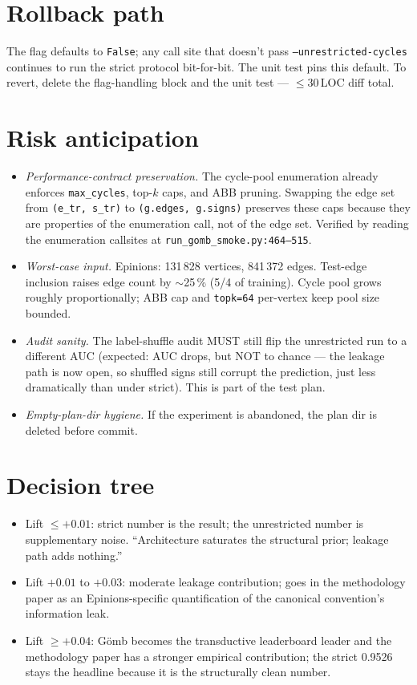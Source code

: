 \documentclass[11pt,a4paper]{article}
\begin{document}
\section{Rollback path}

The flag defaults to \texttt{False}; any call site that doesn't pass
\texttt{--unrestricted-cycles} continues to run the strict protocol
bit-for-bit. The unit test pins this default. To revert, delete
the flag-handling block and the unit test --- $\leq 30$\,LOC
diff total.

\section{Risk anticipation}

\begin{itemize}
\item \emph{Performance-contract preservation.} The cycle-pool
  enumeration already enforces \texttt{max\_cycles}, top-$k$ caps,
  and ABB pruning. Swapping the edge set from \texttt{(e\_tr, s\_tr)}
  to \texttt{(g.edges, g.signs)} preserves these caps because they
  are properties of the enumeration call, not of the edge set.
  Verified by reading the enumeration callsites at
  \texttt{run\_gomb\_smoke.py:464--515}.
\item \emph{Worst-case input.} Epinions: 131\,828 vertices,
  841\,372 edges. Test-edge inclusion raises edge count by
  $\sim$25\,\% (5/4 of training). Cycle pool grows roughly
  proportionally; ABB cap and \texttt{topk=64} per-vertex keep
  pool size bounded.
\item \emph{Audit sanity.} The label-shuffle audit MUST still
  flip the unrestricted run to a different AUC (expected: AUC
  drops, but NOT to chance --- the leakage path is now open, so
  shuffled signs still corrupt the prediction, just less
  dramatically than under strict). This is part of the test plan.
\item \emph{Empty-plan-dir hygiene.} If the experiment is
  abandoned, the plan dir is deleted before commit.
\end{itemize}

\section{Decision tree}

\begin{itemize}
\item Lift $\leq +0.01$: strict number is the result; the
  unrestricted number is supplementary noise. ``Architecture
  saturates the structural prior; leakage path adds nothing.''
\item Lift $+0.01$ to $+0.03$: moderate leakage contribution;
  goes in the methodology paper as an Epinions-specific
  quantification of the canonical convention's information leak.
\item Lift $\geq +0.04$: G\"omb becomes the transductive
  leaderboard leader and the methodology paper has a stronger
  empirical contribution; the strict 0.9526 stays the headline
  because it is the structurally clean number.
\end{itemize}
\end{document}
